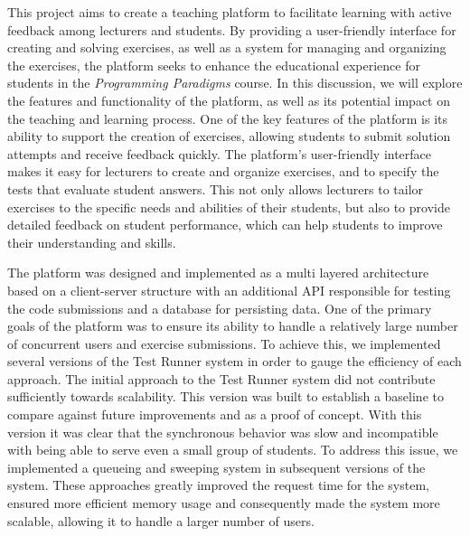 This project aims to create a teaching platform to facilitate learning with active feedback among lecturers and students. 
By providing a user-friendly interface for creating and solving exercises, as well as a system for managing and organizing the exercises, the platform seeks to enhance the educational experience for students in the \textit{Programming Paradigms} course. 
In this discussion, we will explore the features and functionality of the platform, as well as its potential impact on the teaching and learning process.
One of the key features of the platform is its ability to support the creation of exercises, allowing students to submit solution attempts and receive feedback quickly.
The platform's user-friendly interface makes it easy for lecturers to create and organize exercises, and to specify the tests that evaluate student answers. This not only allows lecturers to tailor exercises to the specific needs and abilities of their students, but also to provide detailed feedback on student performance, which can help students to improve their understanding and skills.

The platform was designed and implemented as a multi layered architecture based on a client-server structure with an additional API responsible for testing the code submissions and a database for persisting data. 
One of the primary goals of the platform was to ensure its ability to handle a relatively large number of concurrent users and exercise submissions. 
To achieve this, we implemented several versions of the Test Runner system in order to gauge the efficiency of each approach. 
The initial approach to the Test Runner system did not contribute sufficiently towards scalability.
This version was built to establish a baseline to compare against future improvements and as a proof of concept. With this version it was clear that the synchronous behavior was slow and incompatible with being able to serve even a small group of students.
To address this issue, we implemented a queueing and sweeping system in subsequent versions of the system. These approaches greatly improved the request time for the system, ensured more efficient memory usage and consequently made the system more scalable, allowing it to handle a larger number of users. 

